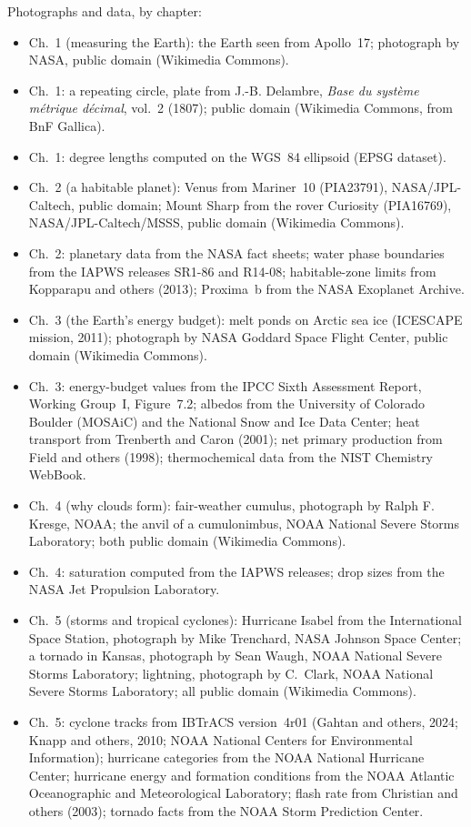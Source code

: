 \bigskip
\noindent Photographs and data, by chapter:
\begin{itemize}\small
  \item Ch.~1 (measuring the Earth): the Earth seen from Apollo~17; photograph by NASA, public domain (Wikimedia Commons).
  \item Ch.~1: a repeating circle, plate from J.-B. Delambre, \emph{Base du système métrique décimal}, vol.~2 (1807); public domain (Wikimedia Commons, from BnF Gallica).
  \item Ch.~1: degree lengths computed on the WGS~84 ellipsoid (EPSG dataset).
  \item Ch.~2 (a habitable planet): Venus from Mariner~10 (PIA23791), NASA/JPL-Caltech, public domain; Mount Sharp from the rover Curiosity (PIA16769), NASA/JPL-Caltech/MSSS, public domain (Wikimedia Commons).
  \item Ch.~2: planetary data from the NASA fact sheets; water phase boundaries from the IAPWS releases SR1-86 and R14-08; habitable-zone limits from Kopparapu and others (2013); Proxima~b from the NASA Exoplanet Archive.
  \item Ch.~3 (the Earth's energy budget): melt ponds on Arctic sea ice (ICESCAPE mission, 2011); photograph by NASA Goddard Space Flight Center, public domain (Wikimedia Commons).
  \item Ch.~3: energy-budget values from the IPCC Sixth Assessment Report, Working Group~I, Figure~7.2; albedos from the University of Colorado Boulder (MOSAiC) and the National Snow and Ice Data Center; heat transport from Trenberth and Caron (2001); net primary production from Field and others (1998); thermochemical data from the NIST Chemistry WebBook.
  \item Ch.~4 (why clouds form): fair-weather cumulus, photograph by Ralph F. Kresge, NOAA; the anvil of a cumulonimbus, NOAA National Severe Storms Laboratory; both public domain (Wikimedia Commons).
  \item Ch.~4: saturation computed from the IAPWS releases; drop sizes from the NASA Jet Propulsion Laboratory.
  \item Ch.~5 (storms and tropical cyclones): Hurricane Isabel from the International Space Station, photograph by Mike Trenchard, NASA Johnson Space Center; a tornado in Kansas, photograph by Sean Waugh, NOAA National Severe Storms Laboratory; lightning, photograph by C.~Clark, NOAA National Severe Storms Laboratory; all public domain (Wikimedia Commons).
  \item Ch.~5: cyclone tracks from IBTrACS version~4r01 (Gahtan and others, 2024; Knapp and others, 2010; NOAA National Centers for Environmental Information); hurricane categories from the NOAA National Hurricane Center; hurricane energy and formation conditions from the NOAA Atlantic Oceanographic and Meteorological Laboratory; flash rate from Christian and others (2003); tornado facts from the NOAA Storm Prediction Center.

\end{itemize}
